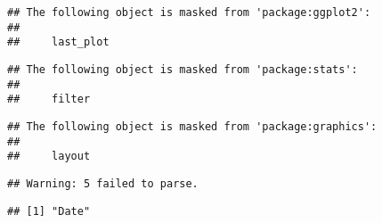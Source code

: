 \documentclass[]{article}
\newenvironment{Shaded}{\begin{snugshade}}{\end{snugshade}}
\newcommand{\DecValTok}[1]{\textcolor[rgb]{0.00,0.00,0.81}{#1}}
\newcommand{\KeywordTok}[1]{\textcolor[rgb]{0.13,0.29,0.53}{\textbf{#1}}}
\newcommand{\NormalTok}[1]{#1}
\newcommand{\OperatorTok}[1]{\textcolor[rgb]{0.81,0.36,0.00}{\textbf{#1}}}
\newcommand{\StringTok}[1]{\textcolor[rgb]{0.31,0.60,0.02}{#1}}
\begin{document}
\begin{verbatim}
## The following object is masked from 'package:ggplot2':
## 
##     last_plot
\end{verbatim}

\begin{verbatim}
## The following object is masked from 'package:stats':
## 
##     filter
\end{verbatim}

\begin{verbatim}
## The following object is masked from 'package:graphics':
## 
##     layout
\end{verbatim}

\begin{Shaded}
\end{Shaded}

\begin{verbatim}
## Warning: 5 failed to parse.
\end{verbatim}

\begin{Shaded}
\end{Shaded}

\begin{verbatim}
## [1] "Date"
\end{verbatim}
\end{document}
